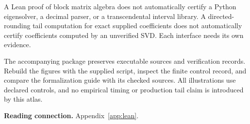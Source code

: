 A Lean proof of block matrix algebra does not automatically certify a Python eigensolver, a decimal parser, or a transcendental interval library. A directed-rounding tail computation for exact supplied coefficients does not automatically certify coefficients computed by an unverified SVD. Each interface needs its own evidence.

The accompanying package preserves executable sources and verification records. Rebuild the figures with the supplied script, inspect the finite control record, and compare the formalization guide with its checked sources. All illustrations use declared controls, and no empirical timing or production tail claim is introduced by this atlas.

\vfill{\footnotesize\color{navy}\textbf{Reading connection.} Appendix~\ref{app:lean}.}

\endgroup
